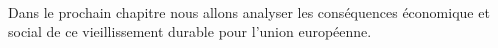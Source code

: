 \paragraph{}Dans le prochain chapitre nous allons analyser les conséquences économique et social de ce vieillissement durable pour l’union européenne.
